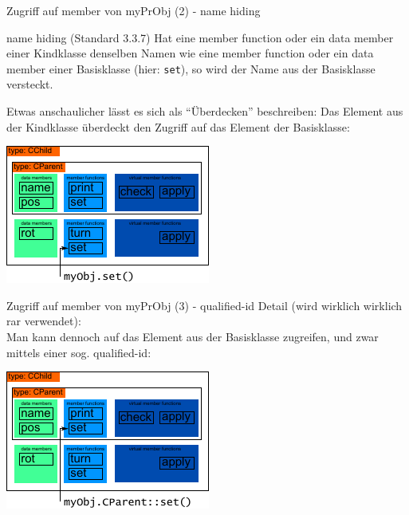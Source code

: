 \begin{frame}[fragile,b]{Zugriff auf member von myPrObj (2) - name hiding}
	\footnotesize
	\begin{block}{name hiding (Standard 3.3.7)}
		Hat eine member function oder ein data member einer Kindklasse denselben Namen wie eine member function oder ein data member einer Basisklasse (hier: \verb|set|), so wird der Name aus der Basisklasse versteckt.
	\end{block}
	
	Etwas anschaulicher lässt es sich als \enquote{Überdecken} beschreiben: Das Element aus der Kindklasse überdeckt den Zugriff auf das Element der Basisklasse:
	
	\vspace{0.75em}
	
	\includegraphics[width=0.5\linewidth]{images/myObj-hidingSet}
\end{frame}

\begin{frame}[fragile,b]{Zugriff auf member von myPrObj (3) - qualified-id}
	Detail (wird wirklich wirklich rar verwendet):\\
	Man kann dennoch auf das Element aus der Basisklasse zugreifen, und zwar mittels einer sog. qualified-id:
	
	\vspace{2em}
	
	\includegraphics[width=0.5\linewidth]{images/myObj-qualifiedSet}
\end{frame}

